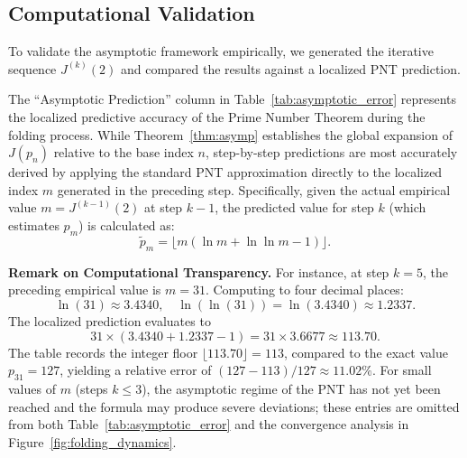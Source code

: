 \documentclass[11pt, a4paper]{article}
\begin{document}
\subsection{Computational Validation}
To validate the asymptotic framework empirically, we generated the iterative sequence $J^{(k)}(2)$ and compared the results against a localized PNT prediction.

The ``Asymptotic Prediction'' column in Table~\ref{tab:asymptotic_error} represents the localized predictive accuracy of the Prime Number Theorem during the folding process. While Theorem~\ref{thm:asymp} establishes the global expansion of $J(p_n)$ relative to the base index $n$, step-by-step predictions are most accurately derived by applying the standard PNT approximation directly to the localized index $m$ generated in the preceding step. Specifically, given the actual empirical value $m = J^{(k-1)}(2)$ at step $k-1$, the predicted value for step $k$ (which estimates $p_m$) is calculated as:
\begin{equation}\label{eq:local_pred}
\tilde{p}_m = \lfloor m (\ln m + \ln \ln m - 1) \rfloor.
\end{equation}

\noindent \textbf{Remark on Computational Transparency.}
For instance, at step $k=5$, the preceding empirical value is $m = 31$. Computing to four decimal places:
\[
\ln(31) \approx 3.4340, \quad \ln(\ln(31)) = \ln(3.4340) \approx 1.2337.
\]
The localized prediction evaluates to
\[
31 \times (3.4340 + 1.2337 - 1) = 31 \times 3.6677 \approx 113.70.
\]
The table records the integer floor $\lfloor 113.70 \rfloor = 113$, compared to the exact value $p_{31} = 127$, yielding a relative error of $(127 - 113)/127 \approx 11.02\%$. For small values of $m$ (steps $k \le 3$), the asymptotic regime of the PNT has not yet been reached and the formula may produce severe deviations; these entries are omitted from both Table~\ref{tab:asymptotic_error} and the convergence analysis in Figure~\ref{fig:folding_dynamics}.
\end{document}
